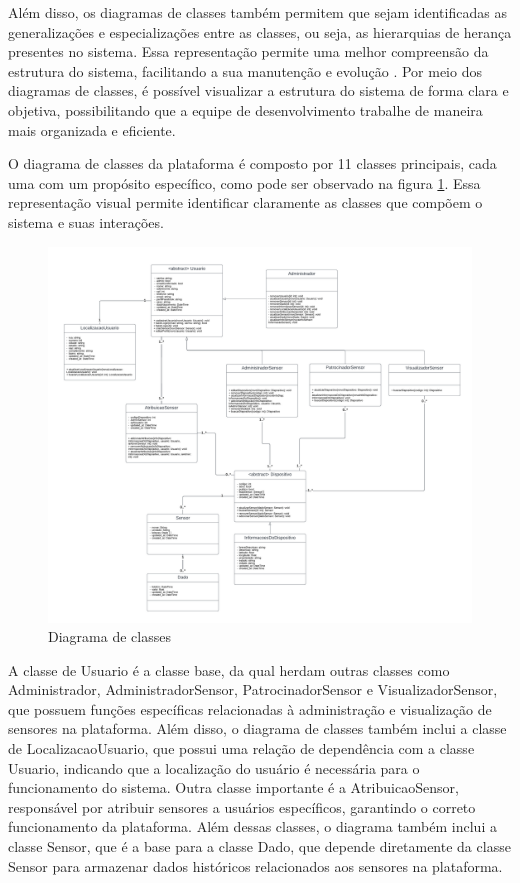 \documentclass[tcc,capa]{texufpel}
\begin{document}
Além disso, os diagramas de classes também permitem que sejam identificadas as generalizações e especializações entre as classes, ou seja, as hierarquias de herança presentes no sistema. Essa representação permite uma melhor compreensão da estrutura do sistema, facilitando a sua manutenção e evolução \citet{BOOCH:2007}. Por meio dos diagramas de classes, é possível visualizar a estrutura do sistema de forma clara e objetiva, possibilitando que a equipe de desenvolvimento trabalhe de maneira mais organizada e eficiente.

O diagrama de classes da plataforma é composto por 11 classes principais, cada uma com um propósito específico, como pode ser observado na figura \ref{diagramaclasses}. Essa representação visual permite identificar claramente as classes que compõem o sistema e suas interações.

\begin{figure}[htbp]
  \centering \includegraphics[scale=.5]{assets/diagramaclasses.png}
  \caption{Diagrama de classes}
  \label{diagramaclasses}
\end{figure}
\newpage


A classe de Usuario é a classe base, da qual herdam outras classes como Administrador, AdministradorSensor, PatrocinadorSensor e VisualizadorSensor, que possuem funções específicas relacionadas à administração e visualização de sensores na plataforma. Além disso, o diagrama de classes também inclui a classe de LocalizacaoUsuario, que possui uma relação de dependência com a classe Usuario, indicando que a localização do usuário é necessária para o funcionamento do sistema. Outra classe importante é a AtribuicaoSensor, responsável por atribuir sensores a usuários específicos, garantindo o correto funcionamento da plataforma. Além dessas classes, o diagrama também inclui a classe Sensor, que é a base para a classe Dado, que depende diretamente da classe Sensor para armazenar dados históricos relacionados aos sensores na plataforma.
\end{document}
